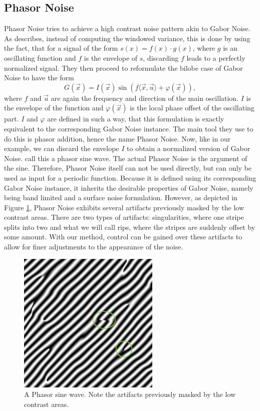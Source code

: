 \documentclass{utue} %
\begin{document}
\subsection{Phasor Noise}\label{sec:phasorNoise}
Phasor Noise tries to achieve a high contrast noise pattern akin to Gabor Noise. As \cite{phasorNoise} describes, instead of computing the windowed variance, this is done by using the fact, that for a signal of the form $s(x) = f(x)\cdot g(x)$, where $g$ is an oscillating function and $f$ is the envelope of $s$, discarding $f$ leads to a perfectly normalized signal. They then proceed to reformulate the bilobe case of Gabor Noise to have the form
$$
G(\vec{x}) = I(\vec{x})\sin{(f\langle\vec{x},\vec{u}\rangle + \varphi(\vec{x}))},
$$
where $f$ and $\vec{u}$ are again the frequency and direction of the main oscillation. $I$ is the envelope of the function and $\varphi(\vec{x})$ is the local phase offset of the oscillating part. $I$ and $\varphi$ are defined in such a way, that this formulation is exactly equivalent to the corresponding Gabor Noise instance. The main tool they use to do this is phasor addition, hence the name Phasor Noise. Now, like in our example, we can discard the envelope $I$ to obtain a normalized version of Gabor Noise. \citeauthor{phasorNoise} call this a phasor sine wave. The actual Phasor Noise is the argument of the sine. Therefore, Phasor Noise itself can not be used directly, but can only be used as input for a periodic function. Because it is defined using its corresponding Gabor Noise instance, it inherits the desirable properties of Gabor Noise, namely being band limited and a surface noise formulation. However, as depicted in Figure \ref{fig:phasorNoise}, Phasor Noise exhibits several artifacts previously masked by the low contrast areas. There are two types of artifacts: singularities, where one stripe splits into two and what we will call rips, where the stripes are suddenly offset by some amount. With our method, control can be gained over these artifacts to allow for finer adjustments to the appearance of the noise.

\begin{figure}[ht]
  \centering
  \includegraphics[width = 0.49\linewidth]{images/phasorSineWave}
  \caption{A Phasor sine wave. Note the artifacts previously masked by the low contrast areas.}\label{fig:phasorNoise}
\end{figure}
\end{document}
